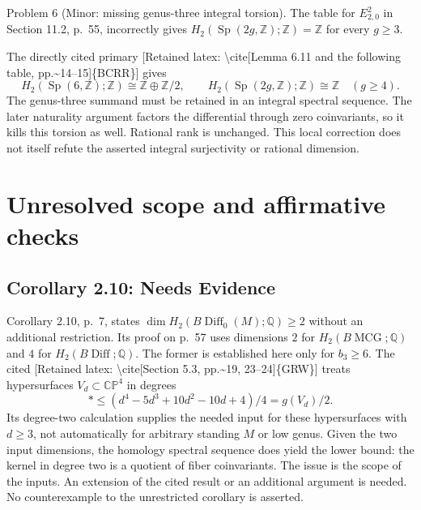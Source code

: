 \documentclass[10pt]{article}
\begin{document}
Problem 6 (Minor: missing genus-three integral torsion).  The table for \(E^2_{2,0}\) in Section 11.2, p. 55, incorrectly gives \(H_2(\operatorname{Sp}(2g,\mathbb Z);\mathbb Z)=\mathbb Z\) for every \(g\ge3\).\par
The directly cited primary [Retained latex: \textbackslash{}cite[Lemma 6.11 and the following table,
pp.\textasciitilde{}14--15]\{BCRR\}] gives \[H_2(\operatorname{Sp}(6,\mathbb Z);\mathbb Z)\cong\mathbb Z\oplus\mathbb Z/2,
 \qquad H_2(\operatorname{Sp}(2g,\mathbb Z);\mathbb Z)\cong\mathbb Z\quad(g\ge4).\] The genus-three summand must be retained in an integral spectral sequence. The later naturality argument factors the differential through zero coinvariants, so it kills this torsion as well. Rational rank is unchanged. This local correction does not itself refute the asserted integral surjectivity or rational dimension.\par
\section*{Unresolved scope and affirmative checks}
\subsection*{Corollary 2.10: Needs Evidence}
Corollary 2.10, p. 7, states \(\dim H_2(B\operatorname{Diff}_0(M);\mathbb Q)\ge2\) without an additional restriction. Its proof on p. 57 uses dimensions \(2\) for \(H_2(B\operatorname{MCG};\mathbb Q)\) and \(4\) for \(H_2(B\operatorname{Diff};\mathbb Q)\). The former is established here only for \(b_3\ge6\). The cited [Retained latex: \textbackslash{}cite[Section 5.3, pp.\textasciitilde{}19, 23--24]\{GRW\}] treats hypersurfaces \(V_d\subset\mathbb {CP}^4\) in degrees \[*\le (d^4-5d^3+10d^2-10d+4)/4=g(V_d)/2 .\] Its degree-two calculation supplies the needed input for these hypersurfaces with \(d\ge3\), not automatically for arbitrary standing \(M\) or low genus. Given the two input dimensions, the homology spectral sequence does yield the lower bound: the kernel in degree two is a quotient of fiber coinvariants. The issue is the scope of the inputs. An extension of the cited result or an additional argument is needed. No counterexample to the unrestricted corollary is asserted.\par
\end{document}
